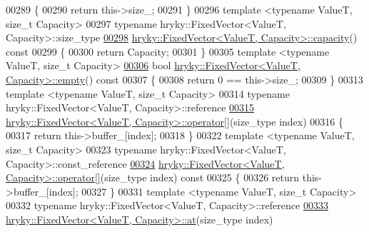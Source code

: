 \begin{DoxyCode}
00289 \textcolor{keyword}{}\{
00290     \textcolor{keywordflow}{return} this->size\_;
00291 \}
00296 \textcolor{keyword}{template} <\textcolor{keyword}{typename} ValueT, \textcolor{keywordtype}{size\_t} Capacity>
00297 \textcolor{keyword}{typename} hryky::FixedVector<ValueT, Capacity>::size\_type
\hypertarget{fixed__vector_8h_source_l00298}{}\hyperlink{classhryky_1_1_fixed_vector_a5525e3acaa5aed71b4a267804d6ba42f}{00298} \hyperlink{classhryky_1_1_fixed_vector}{hryky::FixedVector<ValueT, Capacity>::capacity}()\textcolor{keyword}{ const}
00299 \textcolor{keyword}{}\{
00300     \textcolor{keywordflow}{return} Capacity;
00301 \}
00305 \textcolor{keyword}{template} <\textcolor{keyword}{typename} ValueT, \textcolor{keywordtype}{size\_t} Capacity>
\hypertarget{fixed__vector_8h_source_l00306}{}\hyperlink{classhryky_1_1_fixed_vector_ae50f56db3954b910239ba68b7f296e3d}{00306} \textcolor{keywordtype}{bool} \hyperlink{classhryky_1_1_fixed_vector}{hryky::FixedVector<ValueT, Capacity>::empty}()\textcolor{keyword}{ const}
00307 \textcolor{keyword}{}\{
00308     \textcolor{keywordflow}{return} 0 == this->size\_;
00309 \}
00313 \textcolor{keyword}{template} <\textcolor{keyword}{typename} ValueT, \textcolor{keywordtype}{size\_t} Capacity>
00314 \textcolor{keyword}{typename} hryky::FixedVector<ValueT, Capacity>::reference
\hypertarget{fixed__vector_8h_source_l00315}{}\hyperlink{classhryky_1_1_fixed_vector_a90e3657bfbfb55f47cacfa25cf11a36c}{00315} \hyperlink{classhryky_1_1_fixed_vector}{hryky::FixedVector<ValueT, Capacity>::operator[]}(size\_type index)
00316 \{
00317     \textcolor{keywordflow}{return} this->buffer\_[index];
00318 \}
00322 \textcolor{keyword}{template} <\textcolor{keyword}{typename} ValueT, \textcolor{keywordtype}{size\_t} Capacity>
00323 \textcolor{keyword}{typename} hryky::FixedVector<ValueT, Capacity>::const\_reference
\hypertarget{fixed__vector_8h_source_l00324}{}\hyperlink{classhryky_1_1_fixed_vector_ab0e74c2e03415fa8536dfd9ebc54934e}{00324} \hyperlink{classhryky_1_1_fixed_vector}{hryky::FixedVector<ValueT, Capacity>::operator[]}(size\_type index)\textcolor{keyword}{ const}
00325 \textcolor{keyword}{}\{
00326     \textcolor{keywordflow}{return} this->buffer\_[index];
00327 \}
00331 \textcolor{keyword}{template} <\textcolor{keyword}{typename} ValueT, \textcolor{keywordtype}{size\_t} Capacity>
00332 \textcolor{keyword}{typename} hryky::FixedVector<ValueT, Capacity>::reference
\hypertarget{fixed__vector_8h_source_l00333}{}\hyperlink{classhryky_1_1_fixed_vector_ab3116fe8dc96c1b5b5aa829bcdc0ae35}{00333} \hyperlink{classhryky_1_1_fixed_vector}{hryky::FixedVector<ValueT, Capacity>::at}(size\_type index)

\end{DoxyCode}
